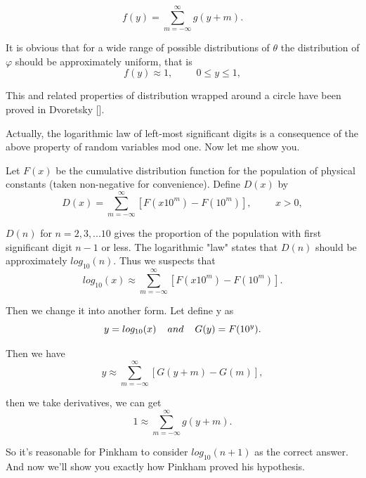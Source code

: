 \documentclass[12pt]{article}
\begin{document}
\begin{equation*}
f(y)=\sum\limits_{m=-\infty}^\infty g(y+m).
\end{equation*}
\par It is obvious that for a wide range of possible distributions of $\theta$ the distribution of $\varphi$ should be approximately uniform, that is
\begin{equation*}
 f(y)\approx1,\hspace{1cm} 0\leq y\leq 1,
\end{equation*}
\par This and related properties of distribution wrapped around a circle have been proved in Dvoretsky [].
\par Actually, the logarithmic law of left-most significant digits is a consequence of the above property of random variables mod one. Now let me show you.
\par Let $F(x)$ be the cumulative distribution function for the population of physical constants (taken non-negative for convenience). Define $D(x)$ by
\begin{equation*}
D(x)=\sum\limits_{m=-\infty}^\infty [F(x10^m)-F(10^m)], \hspace{1cm} x>0,
\end{equation*}
\par $D(n)$ for $n=2,3,...10$ gives the proportion of the population with first significant digit $n-1$ or less. The logarithmic "law" states that $D(n)$ should be approximately $log_{10}(n)$. Thus we suspects that
\begin{equation*}
log_{10}(x)\approx \sum\limits_{m=-\infty}^\infty [F(x10^m)-F(10^m)].
\end{equation*}
\par Then we change it into another form. Let define y as
\begin{equation*}
y=log_{10}(x)\hspace{0.4cm} and \hspace{0.4cm} G(y)=F(10^y).
\end{equation*}
\par Then we have
\begin{equation*}
y\approx \sum\limits_{m=-\infty}^\infty [G(y+m)-G(m)],
\end{equation*}
\par then we take derivatives, we can get
\begin{equation*}
1\approx \sum\limits_{m=-\infty}^\infty g(y+m).
\end{equation*}
\par So it's reasonable for Pinkham to consider $log_{10}(n+1)$ as the correct answer. And now we'll show you exactly how Pinkham proved his hypothesis.
\end{document}
